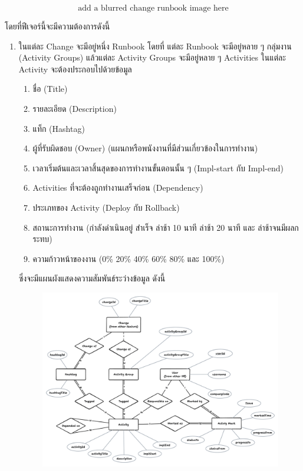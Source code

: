 \[\text{add a blurred change runbook image here}\]

โดยที่ฟีเจอร์นี้จะมีความต้องการดังนี้
\begin{enumerate}
    \item ในแต่ละ Change จะมีอยู่หนึ่ง Runbook โดยที่ แต่ละ Runbook จะมีอยู่หลาย ๆ กลุ่มงาน (Activity Groups) แล้วแต่ละ Activity Groups จะมีอยู่หลาย ๆ Activities ในแต่ละ Activity จะต้องประกอบไปด้วยข้อมูล 
    \begin{enumerate}
        \item ชื่อ (Title)
        \item รายละเอียด (Description) 
        \item แท็ก (Hashtag)
        \item ผู้ที่รับผิดชอบ (Owner) (แผนกหรือพนังงานที่มีส่วนเกี่ยวข้องในการทำงาน)
        \item เวลาเริ่มต้นและเวลาสิ้นสุดของการทำงานขั้นตอนนั้น ๆ (Impl-start กับ Impl-end)
        \item Activities ที่จะต้องถูกทำงานเสร็จก่อน (Dependency)
        \item ประเภทของ Activity (Deploy กับ Rollback)
        \item สถานะการทำงาน (กำลังดำเนินอยู่ สำเร็จ ล่าช้า 10 นาที ล่าช้า 20 นาที และ ล่าช้าจนมีผลกระทบ)
        \item ความก้าวหน้าของงาน (0\% 20\% 40\% 60\% 80\% และ 100\%)
    \end{enumerate}
    ซึ่งจะมีแผนผังแสดงความสัมพันธ์ระว่างข้อมูล ดังนี้
    \begin{figure}[H]
        \begin{center}
            \includegraphics[scale=0.2]{resources/change-runbook-er.png}

\end{center}
\end{figure}
\end{enumerate}
